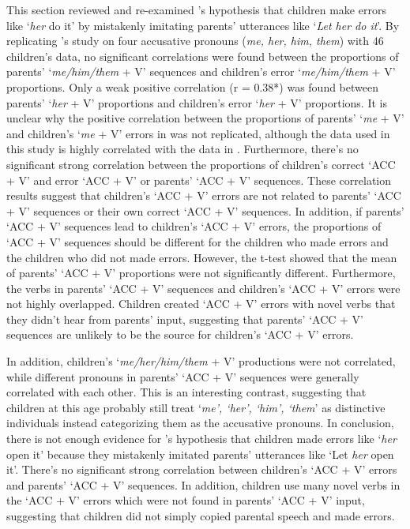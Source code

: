 This section reviewed and re-examined \cite{tomasello2000,tomasello2003}'s hypothesis that children make errors like `\textit{her} do it' by  mistakenly imitating parents' utterances like `\textit{Let her do it}'. By replicating \cite{kirjavainen2009can}'s study on four accusative pronouns (\textit{me, her, him, them}) with 46 children's data, no significant correlations were found between the proportions of parents' `\textit{me/him/them} + V' sequences and children's error `\textit{me/him/them} + V' proportions. Only a weak positive correlation (r = 0.38*) was found between parents' `\textit{her} + V' proportions and children's error `\textit{her} + V' proportions. It is unclear why the positive correlation between the proportions of parents' `\textit{me} + V' and children's `\textit{me} + V' errors in \cite{kirjavainen2009can} was not replicated, although the data used in this study is highly correlated with the data in \cite{kirjavainen2009can}. Furthermore, there's no significant strong correlation between the proportions of children's correct `ACC + V' and error `ACC + V' or parents' `ACC + V' sequences. These correlation results suggest that children's `ACC + V' errors are not related to parents' `ACC + V' sequences or their own correct `ACC + V' sequences. In addition, if parents' `ACC + V' sequences lead to children's `ACC + V' errors, the proportions of `ACC + V' sequences should be different for the children who made errors and the children who did not made errors. However, the t-test showed that the mean of parents' `ACC + V' proportions were not significantly different. Furthermore, the verbs in parents' `ACC + V' sequences and children's `ACC + V' errors were not highly overlapped. Children created `ACC + V' errors with novel verbs that they didn't hear from parents' input, suggesting that parents' `ACC + V' sequences are unlikely to be the source for children's `ACC + V' errors. 

In addition, children's `\textit{me/her/him/them} + V' productions were not correlated, while different pronouns in parents' `ACC + V' sequences were generally correlated with each other. This is an interesting contrast, suggesting that children at this age probably still treat `\textit{me', `her', `him', `them}' as distinctive individuals instead categorizing them as the accusative pronouns. 
In conclusion, there is not enough evidence for \cite{tomasello2000,tomasello2003}'s hypothesis that children made errors like `\textit{her} open it' because they mistakenly imitated parents' utterances like `Let \textit{her} open it'. There's no significant strong correlation between children's `ACC + V' errors and parents' `ACC + V' sequences. In addition, children use many novel verbs in the `ACC + V' errors which were not found in parents' `ACC + V' input, suggesting that children did not simply copied parental speech and made errors. 

